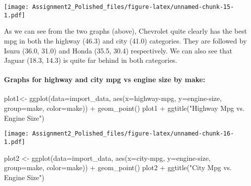 \documentclass[
]{article}
\newenvironment{Shaded}{\begin{snugshade}}{\end{snugshade}}
\newcommand{\AttributeTok}[1]{\textcolor[rgb]{0.77,0.63,0.00}{#1}}
\newcommand{\FunctionTok}[1]{\textcolor[rgb]{0.00,0.00,0.00}{#1}}
\newcommand{\NormalTok}[1]{#1}
\newcommand{\OtherTok}[1]{\textcolor[rgb]{0.56,0.35,0.01}{#1}}
\newcommand{\SpecialCharTok}[1]{\textcolor[rgb]{0.00,0.00,0.00}{#1}}
\newcommand{\StringTok}[1]{\textcolor[rgb]{0.31,0.60,0.02}{#1}}
\begin{document}
\texttt{[image: Assignment2\_Polished\_files/figure-latex/unnamed-chunk-15-1.pdf]}

As we can see from the two graphs (above), Chevrolet quite clearly has
the best mpg in both the highway (46.3) and city (41.0) categories. They
are followed by Isuzu (36.0, 31.0) and Honda (35.5, 30.4) respectively.
We can also see that Jaguar (18.3, 14.3) is quite far behind in both
categories.

\hypertarget{graphs-for-highway-and-city-mpg-vs-engine-size-by-make}{%
\paragraph{Graphs for highway and city mpg vs engine size by
make:}\label{graphs-for-highway-and-city-mpg-vs-engine-size-by-make}}

\begin{Shaded}
\begin{Highlighting}[]
\NormalTok{plot1}\OtherTok{\textless{}{-}} \FunctionTok{ggplot}\NormalTok{(}\AttributeTok{data=}\NormalTok{import\_data, }\FunctionTok{aes}\NormalTok{(}\AttributeTok{x=}\StringTok{\textasciigrave{}}\AttributeTok{highway{-}mpg}\StringTok{\textasciigrave{}}\NormalTok{, }\AttributeTok{y=}\StringTok{\textasciigrave{}}\AttributeTok{engine{-}size}\StringTok{\textasciigrave{}}\NormalTok{, }\AttributeTok{group=}\StringTok{\textasciigrave{}}\AttributeTok{make}\StringTok{\textasciigrave{}}\NormalTok{, }\AttributeTok{color=}\StringTok{\textasciigrave{}}\AttributeTok{make}\StringTok{\textasciigrave{}}\NormalTok{)) }\SpecialCharTok{+}  \FunctionTok{geom\_point}\NormalTok{()}
\NormalTok{plot1 }\SpecialCharTok{+} \FunctionTok{ggtitle}\NormalTok{(}\StringTok{"Highway Mpg vs. Engine Size"}\NormalTok{)}
\end{Highlighting}
\end{Shaded}

\texttt{[image: Assignment2\_Polished\_files/figure-latex/unnamed-chunk-16-1.pdf]}

\begin{Shaded}
\begin{Highlighting}[]
\NormalTok{plot2 }\OtherTok{\textless{}{-}} \FunctionTok{ggplot}\NormalTok{(}\AttributeTok{data=}\NormalTok{import\_data, }\FunctionTok{aes}\NormalTok{(}\AttributeTok{x=}\StringTok{\textasciigrave{}}\AttributeTok{city{-}mpg}\StringTok{\textasciigrave{}}\NormalTok{, }\AttributeTok{y=}\StringTok{\textasciigrave{}}\AttributeTok{engine{-}size}\StringTok{\textasciigrave{}}\NormalTok{, }\AttributeTok{group=}\StringTok{\textasciigrave{}}\AttributeTok{make}\StringTok{\textasciigrave{}}\NormalTok{, }\AttributeTok{color=}\StringTok{\textasciigrave{}}\AttributeTok{make}\StringTok{\textasciigrave{}}\NormalTok{)) }\SpecialCharTok{+} \FunctionTok{geom\_point}\NormalTok{()}
\NormalTok{plot2 }\SpecialCharTok{+} \FunctionTok{ggtitle}\NormalTok{(}\StringTok{"City Mpg vs. Engine Size"}\NormalTok{)}
\end{Highlighting}
\end{Shaded}
\end{document}
